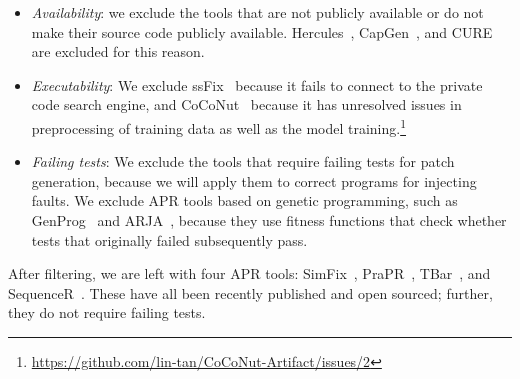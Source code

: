 \documentclass[conference]{IEEEtran}
\begin{document}
\begin{itemize}
\item \textit{Availability}: we exclude the tools that are not publicly
available or do not make their source code publicly available.
Hercules~\cite{saha2019harnessing}, CapGen~\cite{wen2018context}, and
CURE~\cite{jiang2021cure} are excluded for this reason.

\item \textit{Executability}: We exclude ssFix~\cite{xin2017leveraging} because
it fails to connect to the private code search engine, and
CoCoNut~\cite{lutellier2020coconut} because it has unresolved issues in
preprocessing of training data as well as the model
training.\footnote{\url{https://github.com/lin-tan/CoCoNut-Artifact/issues/2}}

\item\textit{Failing tests}: We exclude the tools that require failing tests
for patch generation, because we will apply them to correct programs for
injecting faults. We exclude APR tools based on genetic programming, such as
GenProg~\cite{le2011genprog} and ARJA~\cite{yuan2018arja},
because they use fitness functions that check whether tests that originally
failed subsequently pass.
\end{itemize}

After filtering, we are left with four APR tools: SimFix~\cite{jiang2018shaping},
PraPR~\cite{ghanbari2019practical}, TBar~\cite{liu2019tbar}, and
SequenceR~\cite{chen2019sequencer}. These have all been recently published and
open sourced; further, they do not require failing tests.
\end{document}
